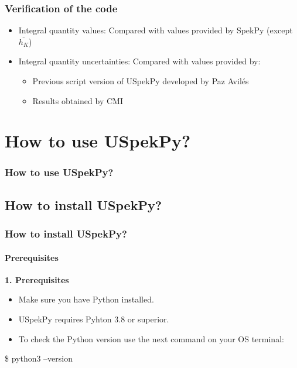 \documentclass{beamer}
\newcommand{\highlight}[1]{{\color{blue} #1}}
\begin{document}
	\begin{frame}
		\frametitle{Verification of the code}
		\begin{itemize}
			\setlength\itemsep{2em}
			\item Integral quantity \highlight{values}: Compared with values provided by SpekPy (except $\overline{h_K}$)
			\item Integral quantity \highlight{uncertainties}: Compared with values provided by:
			\begin{itemize}
				\setlength\itemsep{1em}
				\item Previous script version of USpekPy developed by Paz Avilés
				\item Results obtained by CMI
			\end{itemize}
		\end{itemize}
	\end{frame}
	
	
	\section{How to use USpekPy?}
	
	\begin{frame}
		\frametitle{How to use USpekPy?}
		\tableofcontents[
		currentsection,
		sectionstyle=show/shaded,
		subsectionstyle=show/show/hide
		]
	\end{frame}
	
	\subsection{How to install USpekPy?}
	
	\begin{frame}
		\frametitle{How to install USpekPy?}
		\framesubtitle{Prerequisites}
		\textbf{1. Prerequisites}
		\begin{itemize}
			\item Make sure you have \highlight{Python} installed.
			\item USpekPy requires Pyhton 3.8 or superior.
			\item To check the Python version use the next command on your OS terminal:
		\end{itemize}
		
		\begin{block}{}
			\begin{semiverbatim}
				\$ python3 --version
			\end{semiverbatim}
		\end{block}
	\end{frame}
	
\end{document}
